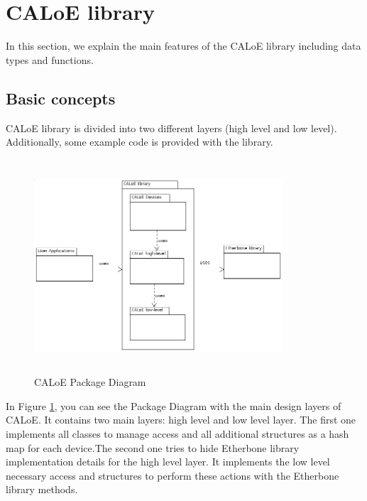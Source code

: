 \section{CALoE library}

In this section, we explain the main features of the CALoE library including data types and functions.

\subsection{Basic concepts}

CALoE library is divided into two different layers (high level and low level). Additionally, some example code is provided with the library.

\begin{figure}[H]
\centering
\includegraphics[width=350px,height=300px]{img/PackageDiagram.png}
\caption{CALoE Package Diagram}
\label{caloe_pd_img}
\end{figure}

In Figure \ref{caloe_pd_img}, you can see the Package Diagram with the main design layers of CALoE. It contains two main layers: high level and low level layer.
The first one implements all classes to manage access and all additional structures as a hash map for each device.The second one tries to hide Etherbone library
implementation details for the high level layer. It implements the low level necessary access and structures to perform these actions with the Etherbone library methods.

